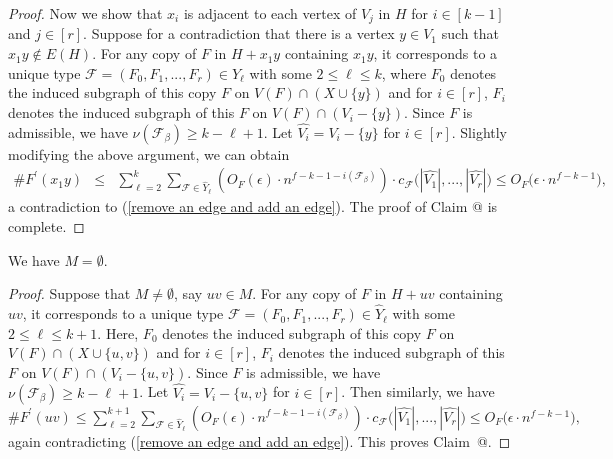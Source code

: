 \documentclass[10pt]{article}
\makeatletter
\newcommand*{\rom}[1]{\expandafter\@slowromancap\romannumeral #1@}
\makeatother
\begin{document}
\begin{proof}
Now we show that $x_i$ is adjacent to each vertex of $V_j$ in $H$ for $i\in [k-1]$ and $j\in [r]$.
Suppose for a contradiction that there is a vertex $y \in V_1$ such that $x_1y\notin E(H)$.
For any copy of $F$ in $H+x_1y$ containing $x_1y$,
it corresponds to a unique type $\mathcal{F}=(F_0,F_1,...,F_r)\in \widehat{Y}_\ell$ with some $2\leq \ell\leq k$,
where $F_0$ denotes the induced subgraph of this copy $F$ on $V(F)\cap (X\cup \{y\})$ and
for $i\in [r]$, $F_i$ denotes the induced subgraph of this $F$ on $V(F)\cap (V_i-\{y\})$.
Since $F$ is admissible, we have $\nu(\mathcal{F}_\beta)\geq k-\ell+1$.
Let $\widehat{V_i}=V_i-\{y\}$ for $i\in [r]$.
Slightly modifying the above argument, we can obtain
\begin{eqnarray*}
\#F^\prime(x_1y)&\leq& \sum_{\ell=2}^{k} \sum_{\mathcal{F}\in \widehat{Y}_\ell} \left(O_F(\epsilon)\cdot n^{f-k-1-i(\mathcal{F}_\beta)}\right) \cdot c_{\mathcal{F}}\big(|\widehat{V_1}|,...,|\widehat{V_r}|\big)\leq O_F\big(\epsilon\cdot n^{f-k-1}\big),
\end{eqnarray*}
a contradiction to (\ref{remove an edge and add an edge}).
The proof of Claim \rom{4} is complete.\end{proof}


\noindent{\bf Claim \rom{5}.} We have $M=\emptyset$.

\begin{proof}
Suppose that $M\neq \emptyset$, say $uv\in M$.
For any copy of $F$ in $H+uv$ containing $uv$,
it corresponds to a unique type $\mathcal{F}=(F_0,F_1,...,F_r)\in \widehat{Y}_\ell$ with some $2\leq \ell\leq k+1$.
Here, $F_0$ denotes the induced subgraph of this copy $F$ on $V(F)\cap (X\cup \{u,v\})$ and
for $i\in [r]$, $F_i$ denotes the induced subgraph of this $F$ on $V(F)\cap (V_i-\{u,v\})$.
Since $F$ is admissible, we have $\nu(\mathcal{F}_\beta)\geq k-\ell+1$.
Let $\widehat{V_i}=V_i-\{u,v\}$ for $i\in [r]$.
Then similarly, we have
$\#F^\prime(uv)\leq \sum_{\ell=2}^{k+1} \sum_{\mathcal{F}\in \widehat{Y}_\ell} \left(O_F(\epsilon)\cdot n^{f-k-1-i(\mathcal{F}_\beta)}\right) \cdot c_{\mathcal{F}}\big(|\widehat{V_1}|,...,|\widehat{V_r}|\big)\leq O_F\big(\epsilon\cdot n^{f-k-1}\big),$
again contradicting (\ref{remove an edge and add an edge}).
This proves Claim~\rom{5}.   \end{proof}
\end{document}
